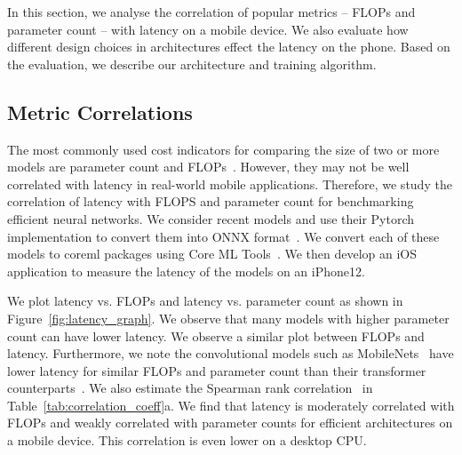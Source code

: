 \label{sec:method}
In this section, we analyse the correlation of popular metrics -- FLOPs and parameter count  -- with latency on a mobile device. We also evaluate how different design choices in architectures effect the latency on the phone. Based on the evaluation, we describe our architecture and training algorithm.


\subsection{Metric Correlations}
The most commonly used cost indicators for comparing the size of two or more models are parameter count and FLOPs~\cite{dehghani2021efficiency}. However, they may not be well correlated with latency in real-world mobile applications.
Therefore, we study the correlation of latency with FLOPS and parameter count for benchmarking efficient neural networks. We consider recent models and use their Pytorch implementation to convert them into ONNX format~\cite{bai2019onnx}. We convert each of these models to coreml packages using Core ML Tools~\cite{coremltools}. 
We then develop an iOS application to measure the latency of the models on an iPhone12.

We plot latency vs. FLOPs and latency vs. parameter count as shown in Figure~\ref{fig:latency_graph}.
We observe that many models with higher parameter count can have lower latency. We observe a similar plot between FLOPs and latency. Furthermore, we note the convolutional models such as MobileNets~\cite{sandler2018mobilenetv2, Ma_2018_shufflenetv2, efficientnet_v2_quoc} have lower latency for similar FLOPs and parameter count than their transformer counterparts~\cite{Touvron_2021_ICCV, mobileformer_cvpr2022, mobilevit_iclr2022}.
We also estimate the Spearman rank correlation~\cite{zar2005spearman} in Table~\ref{tab:correlation_coeff}a. 
We find that latency is moderately correlated with FLOPs and weakly correlated with parameter counts for efficient architectures on a mobile device. This correlation is even lower on a desktop CPU.

